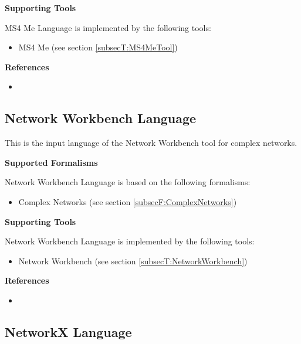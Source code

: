 \textbf{Supporting Tools}

MS4 Me Language is implemented by the following tools:
\begin{itemize}
	\item MS4 Me (see section \ref{subsecT:MS4MeTool})
\end{itemize}


\textbf{References}
\begin{itemize}
	
\item {}
\end{itemize}



\subsection{Network Workbench Language}
\label{subsecL:NetworkWorkbenchLanguage}


This is the input language of the Network Workbench tool for complex networks.

\textbf{Supported Formalisms}

Network Workbench Language is based on the following formalisms:
\begin{itemize}
	\item Complex Networks (see section \ref{subsecF:ComplexNetworks})
\end{itemize}


\textbf{Supporting Tools}

Network Workbench Language is implemented by the following tools:
\begin{itemize}
	\item Network Workbench (see section \ref{subsecT:NetworkWorkbench})
\end{itemize}


\textbf{References}
\begin{itemize}
	
\item {}
\end{itemize}



\subsection{NetworkX Language}
\label{subsecL:NetworkXLanguage}



